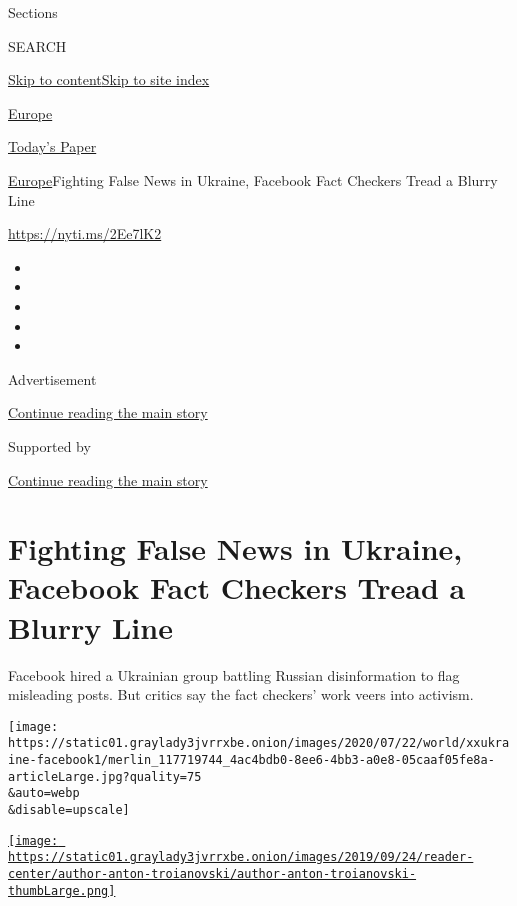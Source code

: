 Sections

SEARCH

\protect\hyperlink{site-content}{Skip to
content}\protect\hyperlink{site-index}{Skip to site index}

\href{https://www.nytimes3xbfgragh.onion/section/world/europe}{Europe}

\href{https://myaccount.nytimes3xbfgragh.onion/auth/login?response_type=cookie\&client_id=vi}{}

\href{https://www.nytimes3xbfgragh.onion/section/todayspaper}{Today's
Paper}

\href{/section/world/europe}{Europe}\textbar{}Fighting False News in
Ukraine, Facebook Fact Checkers Tread a Blurry Line

\href{https://nyti.ms/2Ee7lK2}{https://nyti.ms/2Ee7lK2}

\begin{itemize}
\item
\item
\item
\item
\item
\end{itemize}

Advertisement

\protect\hyperlink{after-top}{Continue reading the main story}

Supported by

\protect\hyperlink{after-sponsor}{Continue reading the main story}

\hypertarget{fighting-false-news-in-ukraine-facebook-fact-checkers-tread-a-blurry-line}{%
\section{Fighting False News in Ukraine, Facebook Fact Checkers Tread a
Blurry
Line}\label{fighting-false-news-in-ukraine-facebook-fact-checkers-tread-a-blurry-line}}

Facebook hired a Ukrainian group battling Russian disinformation to flag
misleading posts. But critics say the fact checkers' work veers into
activism.

\texttt{[image: https://static01.graylady3jvrrxbe.onion/images/2020/07/22/world/xxukraine-facebook1/merlin\_117719744\_4ac4bdb0-8ee6-4bb3-a0e8-05caaf05fe8a-articleLarge.jpg?quality=75\\\&auto=webp\\\&disable=upscale]}

\href{https://www.nytimes3xbfgragh.onion/by/anton-troianovski}{\texttt{[image: https://static01.graylady3jvrrxbe.onion/images/2019/09/24/reader-center/author-anton-troianovski/author-anton-troianovski-thumbLarge.png]}}

